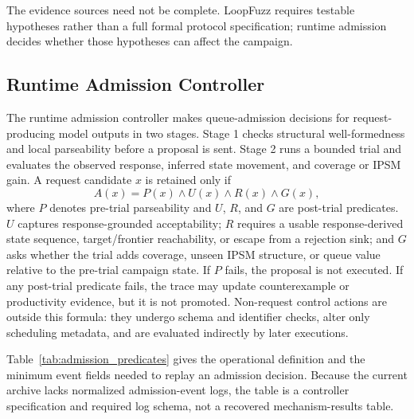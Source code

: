 \documentclass[final,5p,times,number]{elsarticle}
\begin{document}
The evidence sources need not be complete. LoopFuzz requires testable hypotheses rather than a full formal protocol specification; runtime admission decides whether those hypotheses can affect the campaign.

\subsection{Runtime Admission Controller}
The runtime admission controller makes queue-admission decisions for request-producing model outputs in two stages. Stage 1 checks structural well-formedness and local parseability before a proposal is sent. Stage 2 runs a bounded trial and evaluates the observed response, inferred state movement, and coverage or IPSM gain. A request candidate $x$ is retained only if
\[
A(x)=P(x) \land U(x) \land R(x) \land G(x),
\]
where $P$ denotes pre-trial parseability and $U$, $R$, and $G$ are post-trial predicates. $U$ captures response-grounded acceptability; $R$ requires a usable response-derived state sequence, target/frontier reachability, or escape from a rejection sink; and $G$ asks whether the trial adds coverage, unseen IPSM structure, or queue value relative to the pre-trial campaign state. If $P$ fails, the proposal is not executed. If any post-trial predicate fails, the trace may update counterexample or productivity evidence, but it is not promoted. Non-request control actions are outside this formula: they undergo schema and identifier checks, alter only scheduling metadata, and are evaluated indirectly by later executions.

Table~\ref{tab:admission_predicates} gives the operational definition and the minimum event fields needed to replay an admission decision. Because the current archive lacks normalized admission-event logs, the table is a controller specification and required log schema, not a recovered mechanism-results table.
\end{document}
